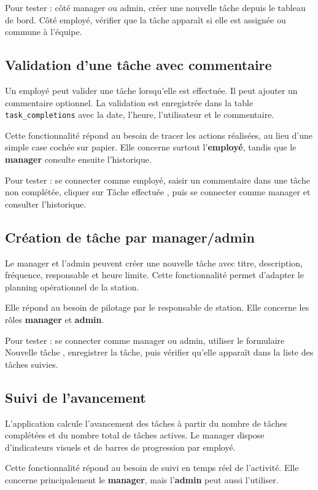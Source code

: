 \documentclass[11pt,a4paper]{article}
\newcommand{\role}[1]{\textbf{\color{oilgreen}#1}}
\newcommand{\code}[1]{\texttt{#1}}
\begin{document}
Pour tester : côté manager ou admin, créer une nouvelle tâche depuis le tableau de bord. Côté employé, vérifier que la tâche apparaît si elle est assignée ou commune à l'équipe.

\subsection{Validation d'une tâche avec commentaire}

Un employé peut valider une tâche lorsqu'elle est effectuée. Il peut ajouter un commentaire optionnel. La validation est enregistrée dans la table \code{task\_completions} avec la date, l'heure, l'utilisateur et le commentaire.

Cette fonctionnalité répond au besoin de tracer les actions réalisées, au lieu d'une simple case cochée sur papier. Elle concerne surtout l'\role{employé}, tandis que le \role{manager} consulte ensuite l'historique.

Pour tester : se connecter comme employé, saisir un commentaire dans une tâche non complétée, cliquer sur \og Tâche effectuée \fg{}, puis se connecter comme manager et consulter l'historique.

\subsection{Création de tâche par manager/admin}

Le manager et l'admin peuvent créer une nouvelle tâche avec titre, description, fréquence, responsable et heure limite. Cette fonctionnalité permet d'adapter le planning opérationnel de la station.

Elle répond au besoin de pilotage par le responsable de station. Elle concerne les rôles \role{manager} et \role{admin}.

Pour tester : se connecter comme manager ou admin, utiliser le formulaire \og Nouvelle tâche \fg{}, enregistrer la tâche, puis vérifier qu'elle apparaît dans la liste des tâches suivies.

\subsection{Suivi de l'avancement}

L'application calcule l'avancement des tâches à partir du nombre de tâches complétées et du nombre total de tâches actives. Le manager dispose d'indicateurs visuels et de barres de progression par employé.

Cette fonctionnalité répond au besoin de suivi en temps réel de l'activité. Elle concerne principalement le \role{manager}, mais l'\role{admin} peut aussi l'utiliser.
\end{document}
